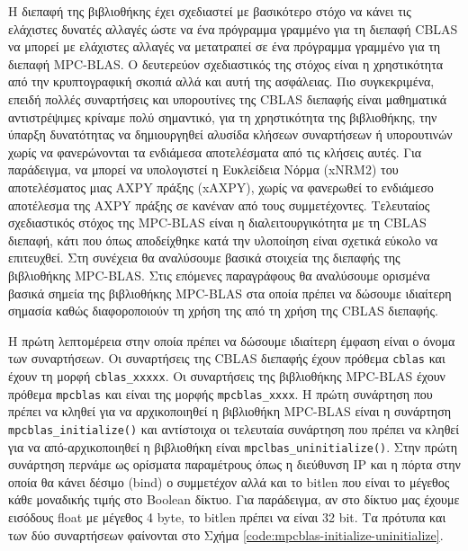 Η διεπαφή της βιβλιοθήκης έχει σχεδιαστεί με βασικότερο στόχο να κάνει τις ελάχιστες δυνατές αλλαγές ώστε να ένα πρόγραμμα γραμμένο για τη διεπαφή CBLAS να μπορεί με ελάχιστες αλλαγές να μετατραπεί σε ένα πρόγραμμα γραμμένο για τη διεπαφή MPC-BLAS. Ο δευτερεύον σχεδιαστικός της στόχος είναι η χρηστικότητα από την κρυπτογραφική σκοπιά αλλά και αυτή της ασφάλειας. Πιο συγκεκριμένα, επειδή πολλές συναρτήσεις και υπορουτίνες της CBLAS διεπαφής είναι μαθηματικά αντιστρέψιμες κρίναμε πολύ σημαντικό, για τη χρηστικότητα της βιβλιοθήκης, την ύπαρξη δυνατότητας να δημιουργηθεί αλυσίδα κλήσεων συναρτήσεων ή υπορουτινών χωρίς να φανερώνονται τα ενδιάμεσα αποτελέσματα από τις κλήσεις αυτές. Για παράδειγμα, να μπορεί να υπολογιστεί η Ευκλείδεια Νόρμα (xNRM2) του αποτελέσματος μιας AXPY πράξης (xAXPY), χωρίς να φανερωθεί το ενδιάμεσο αποτέλεσμα της AXPY πράξης σε κανέναν από τους συμμετέχοντες. Τελευταίος σχεδιαστικός στόχος της MPC-BLAS είναι η διαλειτουργικότητα με τη CBLAS διεπαφή, κάτι που όπως αποδείχθηκε κατά την υλοποίηση είναι σχετικά εύκολο να επιτευχθεί. Στη συνέχεια θα αναλύσουμε βασικά στοιχεία της διεπαφής της βιβλιοθήκης MPC-BLAS. Στις επόμενες παραγράφους θα αναλύσουμε ορισμένα βασικά σημεία της βιβλιοθήκης MPC-BLAS στα οποία πρέπει να δώσουμε ιδιαίτερη σημασία καθώς διαφοροποιούν τη χρήση της από τη χρήση της CBLAS διεπαφής.

Η πρώτη λεπτομέρεια στην οποία πρέπει να δώσουμε ιδιαίτερη έμφαση είναι ο όνομα των συναρτήσεων. Οι συναρτήσεις της CBLAS διεπαφής έχουν πρόθεμα \texttt{cblas} και έχουν τη μορφή \texttt{cblas_xxxxx}. Οι συναρτήσεις της βιβλιοθήκης MPC-BLAS έχουν πρόθεμα \texttt{mpcblas} και είναι της μορφής \texttt{mpcblas_xxxx}. Η πρώτη συνάρτηση που πρέπει να κληθεί για να αρχικοποιηθεί η βιβλιοθήκη MPC-BLAS είναι η συνάρτηση \texttt{mpcblas_initialize()} και αντίστοιχα οι τελευταία συνάρτηση που πρέπει να κληθεί για να από-αρχικοποιηθεί η βιβλιοθήκη είναι \texttt{mpclbas_uninitialize()}. Στην πρώτη συνάρτηση περνάμε ως ορίσματα παραμέτρους όπως η διεύθυνση IP και η πόρτα στην οποία θα κάνει δέσιμο (bind) ο συμμετέχον αλλά και το bitlen που είναι το μέγεθος κάθε μοναδικής τιμής στο Boolean δίκτυο. Για παράδειγμα, αν στο δίκτυο μας έχουμε εισόδους float με μέγεθος 4 byte, το bitlen πρέπει να είναι 32 bit. Τα πρότυπα και των δύο συναρτήσεων φαίνονται στο Σχήμα \ref{code:mpcblas-initialize-uninitialize}.

